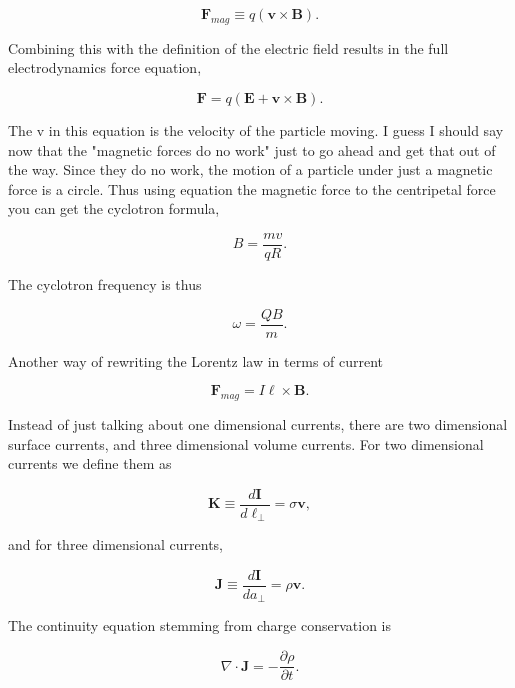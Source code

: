 \documentclass[preprint, review,12pt]{elsarticle}
\def\x{\times}
\def\.{\cdot}
\def\b{\textbf}
\def\bell{\bm{\ell}}
\def\={\equiv}
\def\div{\nabla \.}
\begin{document}
\begin{equation}
    \b{F}_{mag} \= q(\b{v} \x \b{B}).
\end{equation}

Combining this with the definition of the electric field results in the full electrodynamics force equation,

\begin{equation}
    \b{F} = q(\b{E} + \b{v} \x \b{B}).
\end{equation}

The v in this equation is the velocity of the particle moving. I guess I should say now that the "magnetic forces do no work" just to go ahead and get that out of the way. Since they do no work, the motion of a particle under just a magnetic force is a circle. Thus using equation the magnetic force to the centripetal force you can get the cyclotron formula,

\begin{equation}
    B = \frac{mv}{qR}.
\end{equation}

The cyclotron frequency is thus

\begin{equation}
    \omega = \frac{QB}{m}.
\end{equation}

Another way of rewriting the Lorentz law in terms of current

\begin{equation}
    \b{F}_{mag} = I \bell \x \b{B}.
\end{equation}

Instead of just talking about one dimensional currents, there are two dimensional surface currents, and three dimensional volume currents. For two dimensional currents we define them as

\begin{equation}
    \b{K} \= \frac{d\b{I}}{d\ell_\bot} = \sigma \b{v},
\end{equation}

and for three dimensional currents,

\begin{equation}
    \b{J} \= \frac{d\b{I}}{da_\bot} =\rho \b{v}.
\end{equation}

The continuity equation stemming from charge conservation is

\begin{equation}
    \div \b{J} = - \frac{\partial \rho}{\partial t}.
\end{equation}
\end{document}
